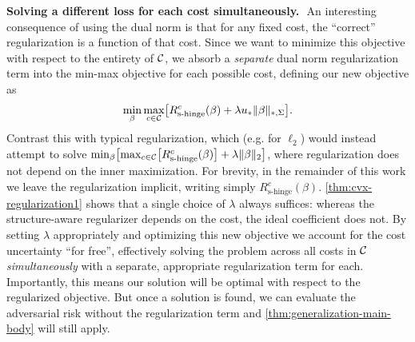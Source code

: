 \documentclass{article}
\newcommand{\costmatrix}{\Sigma}
\newcommand{\costset}{\gC}
\newcommand{\costfunc}{c}
\newcommand{\shingepoprisk}{R_{\textrm{s-hinge}}}
\newcommand{\uinv}{\ensuremath{u_{*}}}
\newcommand{\psdnorm}[2]{\matrixnorm{#1}{#2}}
\newcommand{\dualpsdnorm}[2]{\psdnorm{#1}{*,#2}}
\newcommand{\cinc}{{\costfunc\in\costset}}
\theoremstyle{definition}
\renewcommand{\paragraph}[1]{{\textbf{#1}\,\,}}
\begin{document}
\paragraph{Solving a different loss for each cost simultaneously.}
An interesting consequence of using the dual norm is that for any fixed cost, the ``correct'' regularization is a function of that cost. Since we want to minimize this objective with respect to the entirety of $\costset$, we absorb a \emph{separate} dual norm regularization term into the min-max objective for each possible cost, defining our new objective as
\begin{align}
    \label{eq:regularized-minmax-objective}
    \min_{\beta} \max_{\cinc} \bigl[ \shingepoprisk^c(\beta) + \lambda \uinv \dualpsdnorm{\beta}{\costmatrix} \bigr].
\end{align}
Contrast this with typical regularization, which (e.g. for $\ell_2$) would instead attempt to solve $\min_{\beta} \bigl[  \max_{\cinc}  \bigl[ \shingepoprisk^c(\beta) \bigr] + \lambda \twonorm{\beta} \bigr]$,
where regularization does not depend on the inner maximization.
For brevity, in the remainder of this work we leave the regularization implicit, writing simply $\shingepoprisk^c(\beta)$. \cref{thm:cvx-regularization1} shows that a single choice of $\lambda$ always suffices: whereas the structure-aware regularizer depends on the cost, the ideal coefficient does not. By setting $\lambda$ appropriately and optimizing this new objective we account for the cost uncertainty ``for free'', effectively solving the problem across all costs in $\costset$ \emph{simultaneously} with a separate, appropriate regularization term for each. Importantly, this means our solution will be optimal with respect to the regularized objective. But once a solution is found, we can evaluate the adversarial risk without the regularization term and \cref{thm:generalization-main-body} will still apply.
\end{document}
